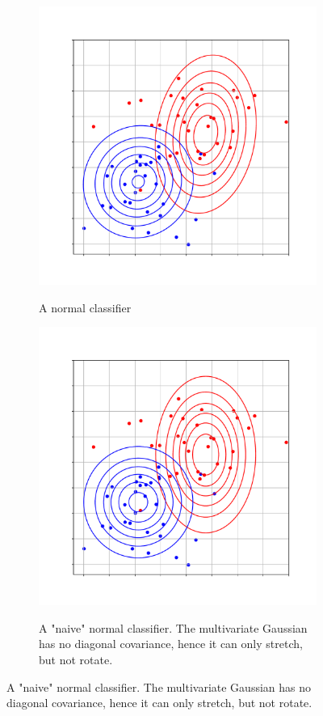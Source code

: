 \documentclass{article}
\begin{document}
\begin{figure}
    \centering
    \begin{subfigure}{0.4\textwidth}
        \centering
        \includegraphics[width=\textwidth]{figures/normal_class}
        \label{fig:udp_header}
        \caption{A normal classifier}
    \end{subfigure}
    \centering
    \begin{subfigure}{0.4\textwidth}
        \centering
        \includegraphics[width=\textwidth]{figures/normal_class_naive}
        \label{fig:tcp_header}
        \caption{A "naive" normal classifier. The multivariate Gaussian has no diagonal covariance, hence it can only stretch, but not rotate.}
    \end{subfigure}
\end{figure}
\end{document}
